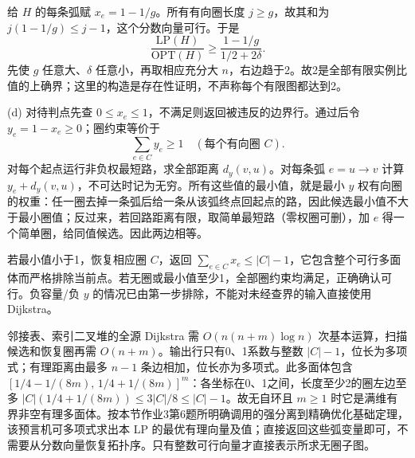 \begin{solution}
给 $H$ 的每条弧赋 $x_e=1-1/g$。所有有向圈长度 $j\ge g$，故其和为 $j(1-1/g)\le j-1$，这个分数向量可行。于是
\[
 \frac{\mathrm{LP}(H)}{\mathrm{OPT}(H)}
 \ge\frac{1-1/g}{1/2+2\delta}.
\]
先使 $g$ 任意大、$\delta$ 任意小，再取相应充分大 $n$，右边趋于2。故2是全部有限实例比值的上确界；这里的构造是存在性证明，不声称每个有限图都达到2。

(d) 对待判点先查 $0\le x_e\le1$，不满足则返回被违反的边界行。通过后令 $y_e=1-x_e\ge0$；圈约束等价于
\[
 \sum_{e\in C}y_e\ge1\quad(\text{每个有向圈 }C).
\]
对每个起点运行非负权最短路，求全部距离 $d_y(v,u)$。对每条弧 $e=u\to v$ 计算 $y_e+d_y(v,u)$，不可达时记为无穷。所有这些值的最小值，就是最小 $y$ 权有向圈的权重：任一圈去掉一条弧后给一条从该弧终点回起点的路，因此候选最小值不大于最小圈值；反过来，若回路距离有限，取简单最短路（零权圈可删），加 $e$ 得一个简单圈，给同值候选。因此两边相等。

若最小值小于1，恢复相应圈 $C$，返回 $\sum_{e\in C}x_e\le |C|-1$，它包含整个可行多面体而严格排除当前点。若无圈或最小值至少1，全部圈约束均满足，正确确认可行。负容量/负 $y$ 的情况已由第一步排除，不能对未经查界的输入直接使用 Dijkstra。

邻接表、索引二叉堆的全源 Dijkstra 需 $O(n(n+m)\log n)$ 次基本运算，扫描候选和恢复圈再需 $O(n+m)$。输出行只有0、1系数与整数 $|C|-1$，位长为多项式；有理距离由最多 $n-1$ 条边相加，位长亦为多项式。此多面体包含 $[1/4-1/(8m),\,1/4+1/(8m)]^m$：各坐标在0、1之间，长度至少2的圈左边至多 $|C|(1/4+1/(8m))\le3|C|/8\le |C|-1$。故无自环且 $m\ge1$ 时它是满维有界非空有理多面体。按本节作业3第6题所明确调用的强分离到精确优化基础定理，该预言机可多项式求出本 LP 的最优有理向量及值；直接返回这些弧变量即可，不需要从分数向量恢复拓扑序。只有整数可行向量才直接表示所求无圈子图。
\end{solution}
